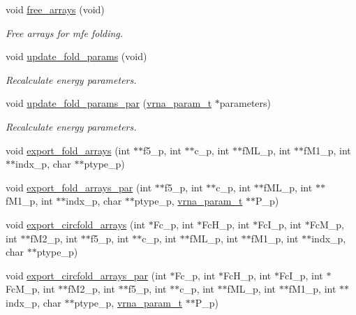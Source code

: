 \begin{DoxyCompactItemize}
void \hyperlink{group__mfe__fold__single_ga107fdfe5fd641868156bfd849f6866c7}{free\+\_\+arrays} (void)
\begin{DoxyCompactList}\small\item\em Free arrays for mfe folding. \end{DoxyCompactList}\item 
void \hyperlink{group__mfe__fold__single_ga41bf8f6fa15b94471f7095cad9f0ccf3}{update\+\_\+fold\+\_\+params} (void)
\begin{DoxyCompactList}\small\item\em Recalculate energy parameters. \end{DoxyCompactList}\item 
void \hyperlink{group__mfe__fold__single_gae66dc422efb8f5d56717d92d6002a9f8}{update\+\_\+fold\+\_\+params\+\_\+par} (\hyperlink{group__energy__parameters_ga8a69ca7d787e4fd6079914f5343a1f35}{vrna\+\_\+param\+\_\+t} $\ast$parameters)
\begin{DoxyCompactList}\small\item\em Recalculate energy parameters. \end{DoxyCompactList}\item 
void \hyperlink{group__mfe__fold__single_ga99641b8dbb40891da5490d3cc271e607}{export\+\_\+fold\+\_\+arrays} (int $\ast$$\ast$f5\+\_\+p, int $\ast$$\ast$c\+\_\+p, int $\ast$$\ast$f\+M\+L\+\_\+p, int $\ast$$\ast$f\+M1\+\_\+p, int $\ast$$\ast$indx\+\_\+p, char $\ast$$\ast$ptype\+\_\+p)
\item 
void \hyperlink{group__mfe__fold__single_ga6606ec0ec964ea506fdadb997a1a5328}{export\+\_\+fold\+\_\+arrays\+\_\+par} (int $\ast$$\ast$f5\+\_\+p, int $\ast$$\ast$c\+\_\+p, int $\ast$$\ast$f\+M\+L\+\_\+p, int $\ast$$\ast$f\+M1\+\_\+p, int $\ast$$\ast$indx\+\_\+p, char $\ast$$\ast$ptype\+\_\+p, \hyperlink{group__energy__parameters_ga8a69ca7d787e4fd6079914f5343a1f35}{vrna\+\_\+param\+\_\+t} $\ast$$\ast$P\+\_\+p)
\item 
void \hyperlink{group__mfe__fold__single_ga04d5d639fd4473ca766436a9bae5665c}{export\+\_\+circfold\+\_\+arrays} (int $\ast$Fc\+\_\+p, int $\ast$Fc\+H\+\_\+p, int $\ast$Fc\+I\+\_\+p, int $\ast$Fc\+M\+\_\+p, int $\ast$$\ast$f\+M2\+\_\+p, int $\ast$$\ast$f5\+\_\+p, int $\ast$$\ast$c\+\_\+p, int $\ast$$\ast$f\+M\+L\+\_\+p, int $\ast$$\ast$f\+M1\+\_\+p, int $\ast$$\ast$indx\+\_\+p, char $\ast$$\ast$ptype\+\_\+p)
\item 
void \hyperlink{group__mfe__fold__single_ga004bb901e7fd2f8d5ae68f9530318ce1}{export\+\_\+circfold\+\_\+arrays\+\_\+par} (int $\ast$Fc\+\_\+p, int $\ast$Fc\+H\+\_\+p, int $\ast$Fc\+I\+\_\+p, int $\ast$Fc\+M\+\_\+p, int $\ast$$\ast$f\+M2\+\_\+p, int $\ast$$\ast$f5\+\_\+p, int $\ast$$\ast$c\+\_\+p, int $\ast$$\ast$f\+M\+L\+\_\+p, int $\ast$$\ast$f\+M1\+\_\+p, int $\ast$$\ast$indx\+\_\+p, char $\ast$$\ast$ptype\+\_\+p, \hyperlink{group__energy__parameters_ga8a69ca7d787e4fd6079914f5343a1f35}{vrna\+\_\+param\+\_\+t} $\ast$$\ast$P\+\_\+p)

\end{DoxyCompactItemize}

